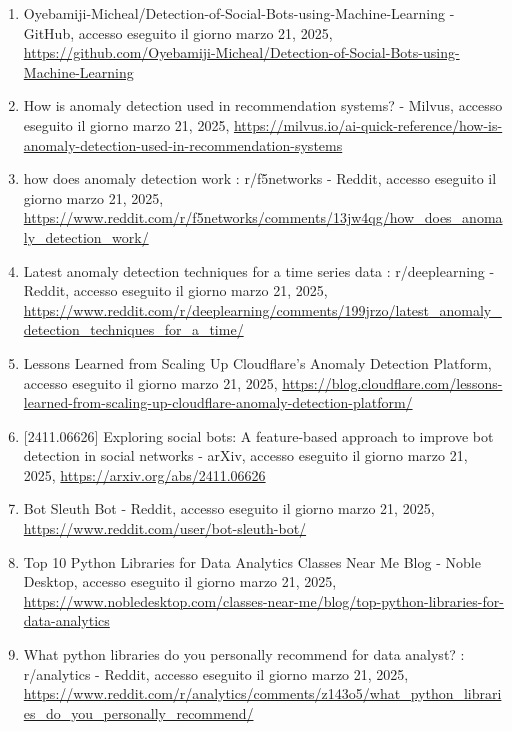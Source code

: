 \documentclass[
  12pt,
  letterpaper,
  DIV=11,
  numbers=noendperiod]{scrartcl}
\begin{document}
\begin{enumerate}
\item
  Oyebamiji-Micheal/Detection-of-Social-Bots-using-Machine-Learning -
  GitHub, accesso eseguito il giorno marzo 21, 2025,
  \url{https://github.com/Oyebamiji-Micheal/Detection-of-Social-Bots-using-Machine-Learning}\\
\item
  How is anomaly detection used in recommendation systems? - Milvus,
  accesso eseguito il giorno marzo 21, 2025,
  \url{https://milvus.io/ai-quick-reference/how-is-anomaly-detection-used-in-recommendation-systems}\\
\item
  how does anomaly detection work : r/f5networks - Reddit, accesso
  eseguito il giorno marzo 21, 2025,
  \url{https://www.reddit.com/r/f5networks/comments/13jw4qg/how_does_anomaly_detection_work/}\\
\item
  Latest anomaly detection techniques for a time series data :
  r/deeplearning - Reddit, accesso eseguito il giorno marzo 21, 2025,
  \url{https://www.reddit.com/r/deeplearning/comments/199jrzo/latest_anomaly_detection_techniques_for_a_time/}\\
\item
  Lessons Learned from Scaling Up Cloudflare's Anomaly Detection
  Platform, accesso eseguito il giorno marzo 21, 2025,
  \url{https://blog.cloudflare.com/lessons-learned-from-scaling-up-cloudflare-anomaly-detection-platform/}\\
\item
  {[}2411.06626{]} Exploring social bots: A feature-based approach to
  improve bot detection in social networks - arXiv, accesso eseguito il
  giorno marzo 21, 2025, \url{https://arxiv.org/abs/2411.06626}\\
\item
  Bot Sleuth Bot - Reddit, accesso eseguito il giorno marzo 21, 2025,
  \url{https://www.reddit.com/user/bot-sleuth-bot/}\\
\item
  Top 10 Python Libraries for Data Analytics \textbar{} Classes Near Me
  Blog - Noble Desktop, accesso eseguito il giorno marzo 21, 2025,
  \url{https://www.nobledesktop.com/classes-near-me/blog/top-python-libraries-for-data-analytics}\\
\item
  What python libraries do you personally recommend for data analyst? :
  r/analytics - Reddit, accesso eseguito il giorno marzo 21, 2025,
  \url{https://www.reddit.com/r/analytics/comments/z143o5/what_python_libraries_do_you_personally_recommend/}\\

\end{enumerate}
\end{document}
